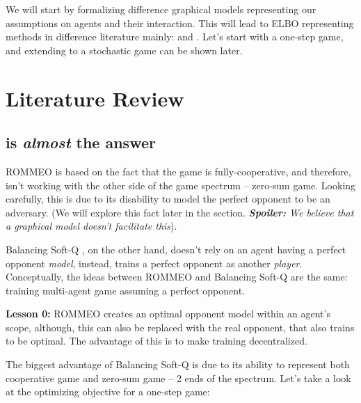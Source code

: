 We will start by formalizing difference graphical models representing our assumptions on agents and their interaction. This will lead to ELBO representing methods in difference literature mainly:  \cite{tian2019regularized} and \cite{grau2018balancing}. Let's start with a one-step game, and extending to a stochastic game can be shown later.

\section{Literature Review}
\subsection{\cite{grau2018balancing} is \emph{almost} the answer}
ROMMEO \cite{tian2019regularized} is based on the fact that the game is fully-cooperative, and therefore, isn't working with the other side of the game spectrum -- zero-sum game. Looking carefully, this is due to its disability to model the perfect opponent to be an adversary. (We will explore this fact later in the section. \emph{\textbf{Spoiler:} We believe that a graphical model doesn't facilitate this}). 

Balancing Soft-Q \cite{grau2018balancing}, on the other hand, doesn't rely on an agent having a perfect opponent \emph{model}, instead, trains a perfect opponent as another \emph{player}. Conceptually, the ideas between ROMMEO and Balancing Soft-Q are the same: training multi-agent game assuming a perfect opponent. 
\begin{tcolorbox}
\textbf{Lesson 0: } ROMMEO creates an optimal opponent model within an agent's scope, although, this can also be replaced with the real opponent, that also trains to be optimal. The advantage of this is to make training decentralized. 
\end{tcolorbox}
The biggest advantage of Balancing Soft-Q is due to its ability to represent both cooperative game and zero-sum game -- 2 ends of the spectrum. Let's take a look at the optimizing objective for a one-step game: 

